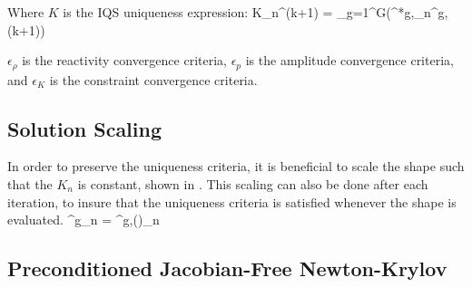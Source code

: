 Where $K$ is the IQS uniqueness expression:
\be 
K_n^{(k+1)} = \sum_{g=1}^G\left(\phi^{*g},\varphi_n^{g,(k+1)}\right)
\label{eq:K}
\ee

$\epsilon_{\rho}$ is the reactivity convergence criteria, $\epsilon_{p}$ is the amplitude convergence criteria, and $\epsilon_{K}$ is the constraint convergence criteria.

\subsection{Solution Scaling}

In order to preserve the uniqueness criteria, it is beneficial to scale the shape such that the $K_n$ is constant, shown in .  This scaling can also be done after each iteration, to insure that the uniqueness criteria is satisfied whenever the shape is evaluated.
\be 
\varphi^{g}_n = \varphi^{g,()}_n 
\label{eq:shape_scale}
\ee

\subsection{Preconditioned Jacobian-Free Newton-Krylov}

